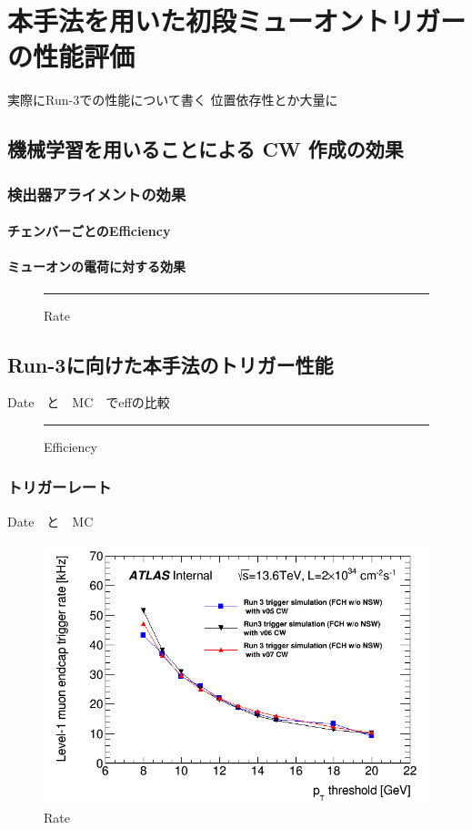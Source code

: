\chapter{本手法を用いた初段ミューオントリガーの性能評価}
実際にRun-3での性能について書く
位置依存性とか大量に

\section{機械学習を用いることによる CW 作成の効果}
\subsection{検出器アライメントの効果}
\subsubsection{チェンバーごとのEfficiency}
\subsubsection{ミューオンの電荷に対する効果}

\begin{figure}[tb]
  \centering
  \rule{8cm}{6cm}
  \caption{Rate}
  \label{fig:fit_def}
\end{figure}


\section{Run-3に向けた本手法のトリガー性能}
Date　と　MC　でeffの比較
\begin{figure}[tb]
  \centering
  \rule{8cm}{6cm}
  \caption{Efficiency}
  \label{fig:fit_def}
\end{figure}

\subsection{トリガーレート}
Date　と　MC
\begin{figure}[tb]
  \centering
  \includegraphics[clip, width=14cm]{fig/5/l1mue_rate_run3.png}
  \caption{Rate}
  \label{fig:fit_def}
\end{figure}

